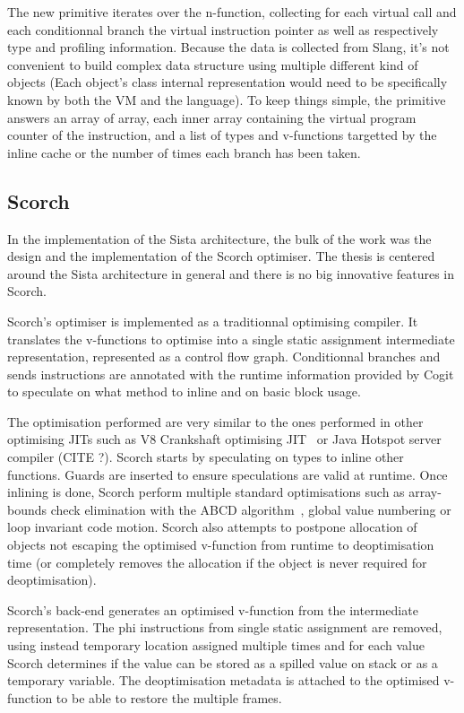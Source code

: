 \documentclass[a4paper,12pt,twoside]{../includes/ThesisStyle}
\begin{document}
The new primitive iterates over the n-function, collecting for each virtual call and each conditionnal branch the virtual instruction pointer as well as respectively type and profiling information. Because the data is collected from Slang, it's not convenient to build complex data structure using multiple different kind of objects (Each object's class internal representation would need to be specifically known by both the VM and the language). To keep things simple, the primitive answers an array of array, each inner array containing the virtual program counter of the instruction, and a list of types and v-functions targetted by the inline cache or the number of times each branch has been taken.

\subsection{Scorch}

In the implementation of the Sista architecture, the bulk of the work was the design and the implementation of the Scorch optimiser. The thesis is centered around the Sista architecture in general and there is no big innovative features in Scorch.

Scorch's optimiser is implemented as a traditionnal optimising compiler. It translates the v-functions to optimise into a single static assignment intermediate representation, represented as a control flow graph. Conditionnal branches and sends instructions are annotated with the runtime information provided by Cogit to speculate on what method to inline and on basic block usage.

The optimisation performed are very similar to the ones performed in other optimising JITs such as V8 Crankshaft optimising JIT~\cite{V8} or Java Hotspot server compiler (CITE ?). Scorch starts by speculating on types to inline other functions. Guards are inserted to ensure speculations are valid at runtime. Once inlining is done, Scorch perform multiple standard optimisations such as array-bounds check elimination with the ABCD algorithm~\cite{Bodi00a}, global value numbering or loop invariant code motion. Scorch also attempts to postpone allocation of objects not escaping the optimised v-function from runtime to deoptimisation time (or completely removes the allocation if the object is never required for deoptimisation).

Scorch's back-end generates an optimised v-function from the intermediate representation. The phi instructions from single static assignment are removed, using instead temporary location assigned multiple times and for each value Scorch determines if the value can be stored as a spilled value on stack or as a temporary variable. The deoptimisation metadata is attached to the optimised v-function to be able to restore the multiple frames.
\end{document}
